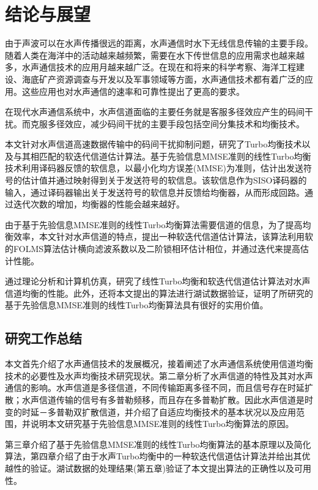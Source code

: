 %
\chapter{结论与展望}
\thispagestyle{empty}
由于声波可以在水声传播很远的距离，水声通信时水下无线信息传输的主要手段。随着人类在海洋中的活动越来越频繁，需要在水下传世信息的应用需求也越来越多，水声通信技术的应用月越来越广泛。在现在和将来的科学考察、海洋工程建设、海底矿产资源调查与开发以及军事领域等方面，水声通信技术都有着广泛的应用。这些应用也对水声通信的速率和可靠性提出了更高的要求。

在现代水声通信系统中，水声信道面临的主要任务就是客服多径效应产生的码间干扰。而克服多径效应，减少码间干扰的主要手段包括空间分集技术和均衡技术。

本文针对水声信道高速数据传输中的码间干扰抑制问题，研究了Turbo均衡技术以及与其相匹配的软迭代信道估计算法。基于先验信息MMSE准则的线性Turbo均衡技术利用译码器反馈的软信息，以最小化均方误差(MMSE)为准则，估计出发送符号的估计值并通过映射得到关于发送符号的软信息。该软信息作为SISO译码器的输入，通过译码器输出关于发送符号的软信息并反馈给均衡器，从而形成回路。通过迭代次数的增加，均衡器的性能会越来越好。

由于基于先验信息MMSE准则的线性Turbo均衡算法需要信道的信息，为了提高均衡效率，本文针对水声信道的特点，提出一种软迭代信道估计算法，该算法利用软的FOLMS算法估计横向滤波系数以及二阶锁相环估计相位，并通过迭代来提高估计性能。

通过理论分析和计算机仿真，研究了线性Turbo均衡和软迭代信道估计算法对水声信道均衡的性能。此外，还将本文提出的算法进行湖试数据验证，证明了所研究的基于先验信息MMSE准则的线性Turbo均衡算法具有很好的实用价值。
\section{研究工作总结}
本文首先介绍了水声通信技术的发展概况，接着阐述了水声通信系统使用信道均衡技术的必要性及水声均衡技术研究现状。第二章分析了水声信道的特性及其对水声通信的影响。水声信道是多径信道，不同传输距离多径不同，而且信号存在时延扩散；水声信道传输的信号有多普勒频移，而且存在多普勒扩散。因此水声信道是时变的时延－多普勒双扩散信道，并介绍了自适应均衡技术的基本状况以及应用范围，并说明本文研究基于先验信息MMSE准则的线性Turbo均衡算法的原因。

第三章介绍了基于先验信息MMSE准则的线性Turbo均衡算法的基本原理以及简化算法，第四章介绍了由于水声Turbo均衡中的一种软迭代信道估计算法并给出其优越性的验证。湖试数据的处理结果(第五章)验证了本文提出算法的正确性以及可用性。

